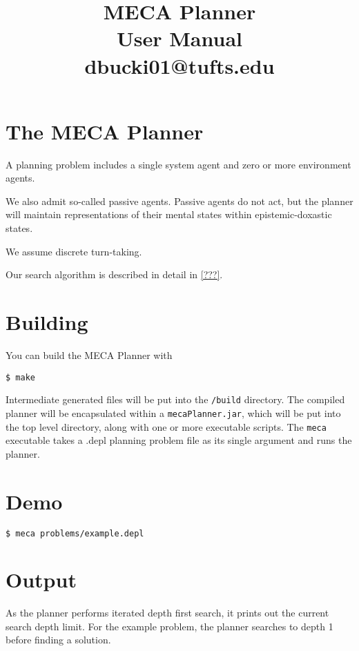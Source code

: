 \documentclass{article}
\title{MECA Planner  \\
\large User Manual \\
dbucki01@tufts.edu
}
\begin{document}
\maketitle

\tableofcontents


\section{The MECA Planner}

A planning problem includes a single system agent and zero or more environment
agents. 

We also admit so-called passive agents. Passive agents do not act, but the
planner will maintain representations of their mental states within
epistemic-doxastic states.

We assume discrete turn-taking.

Our search algorithm is described in detail in \ref{???}.


\section{Building}


You can build the MECA Planner with

\begin{lstlisting}
$ make
\end{lstlisting}

Intermediate generated files will be put into the \verb|/build| directory. 
The compiled planner will be encapsulated within a \verb|mecaPlanner.jar|, which
will be put into the top level directory, along with one or more executable scripts. 
The \verb|meca| executable takes a .depl planning problem file as its single
argument and runs the planner.


\section{Demo}

\begin{lstlisting}
$ meca problems/example.depl
\end{lstlisting}


\section{Output}

As the planner performs iterated depth first search, it prints out the current
search depth limit. For the example problem, the planner searches to depth 1
before finding a solution.
\end{document}
